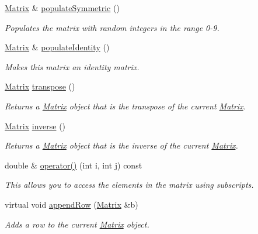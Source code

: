 \begin{DoxyCompactItemize}
\hyperlink{class_matrix}{Matrix} \& \hyperlink{class_matrix_abeb4729f525e85a0f1f516675677e105}{populateSymmetric} ()
\begin{DoxyCompactList}\small\item\em Populates the matrix with random integers in the range 0-\/9. \item\end{DoxyCompactList}\item 
\hyperlink{class_matrix}{Matrix} \& \hyperlink{class_matrix_a0ee71091770a4e83e54860f291ef1b7d}{populateIdentity} ()
\begin{DoxyCompactList}\small\item\em Makes this matrix an identity matrix. \item\end{DoxyCompactList}\item 
\hyperlink{class_matrix}{Matrix} \hyperlink{class_matrix_ae23f817021383e3c8636a714dcba1d21}{transpose} ()
\begin{DoxyCompactList}\small\item\em Returns a \hyperlink{class_matrix}{Matrix} object that is the transpose of the current \hyperlink{class_matrix}{Matrix}. \item\end{DoxyCompactList}\item 
\hyperlink{class_matrix}{Matrix} \hyperlink{class_matrix_ac4f5e7d4bb1bfd6586bd3384bd2a02b0}{inverse} ()
\begin{DoxyCompactList}\small\item\em Returns a \hyperlink{class_matrix}{Matrix} object that is the inverse of the current \hyperlink{class_matrix}{Matrix}. \item\end{DoxyCompactList}\item 
double \& \hyperlink{class_matrix_a3d361fded5f8992d2202894ca141eb72}{operator()} (int i, int j) const 
\begin{DoxyCompactList}\small\item\em This allows you to access the elements in the matrix using subscripts. \item\end{DoxyCompactList}\item 
virtual void \hyperlink{class_matrix_a20c175983a6b23a83fccfe8f726b3b07}{appendRow} (\hyperlink{class_matrix}{Matrix} \&b)
\begin{DoxyCompactList}\small\item\em Adds a row to the current \hyperlink{class_matrix}{Matrix} object. \item\end{DoxyCompactList}\item 

\end{DoxyCompactItemize}
